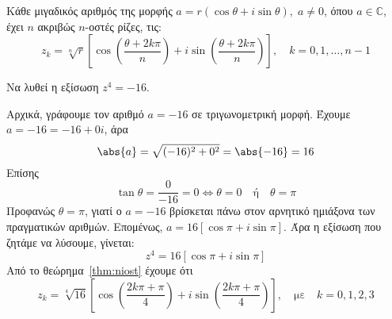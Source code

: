       \begin{thm}\label{thm:niost}
        Κάθε μιγαδικός αριθμός της μορφής $a=r(\cos\theta+i\sin\theta), \; a\neq 0$,
        όπου $ a \in \mathbb{C} $, έχει $n$ ακριβώς $n$-οστές ρίζες, τις: 
        \[
          \boxed{z_{k}=\sqrt[n]{r}\left[ \cos\left(\frac{\theta+2k\pi}{n}\right)+i
          \sin\left(\frac{\theta+2k\pi}{n}\right) \right], \quad k=0,1,\ldots, n-1}
        \]
      \end{thm}
      \begin{example}
        Να λυθεί η εξίσωση $ z^{4} = -16 $. 
      \end{example}
      \begin{solution}
        Αρχικά, γράφουμε τον αριθμό $ a = -16 $ σε τριγωνομετρική μορφή. Έχουμε 
        $ a=-16=-16+0i $, άρα 
        \[ 
          \abs{a} = \sqrt{(-16)^{2}+0^2} = \abs{-16} = 16 
        \] 
        Επίσης
        \[
          \tan{\theta} = \frac{0}{-16} = 0 \Leftrightarrow \theta =0 \quad
          \text{ή} \quad \theta = \pi
        \] 
        Προφανώς $ \theta = \pi $, γιατί ο $a=-16$ βρίσκεται πάνω στον αρνητικό 
        ημιάξονα των πραγματικών αριθμών. Επομένως, $ a = 16[\cos{\pi} + i
        \sin{\pi}] $. Άρα η εξίσωση που ζητάμε να λύσουμε, γίνεται:
        \[
          z^{4} = 16 [\cos{\pi} + i \sin{\pi}] 
        \] 
        Από το θεώρημα~\ref{thm:niost} έχουμε ότι
        \[
          z_{k} = \sqrt[4]{16} \left[\cos{\left(\frac{2k \pi + \pi}{4}\right)} + i
          \sin{\left(\frac{2k \pi + \pi}{ 4}\right)}\right], 
          \quad \text{με} \quad k=0,1,2,3
        \] 


      \end{solution}



      
